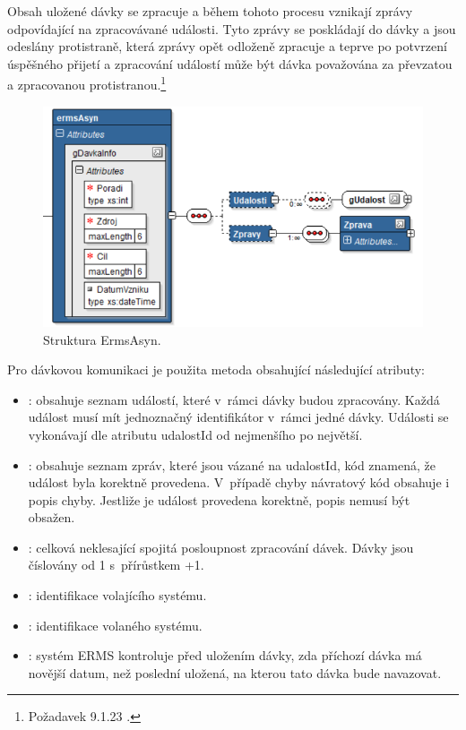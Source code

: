 \documentclass[
  master,
  field=ainfp,
  biblatex,
  language=czech,
  glossaries,
  theorems=false,
  index
]{kidiplom}
\begin{document}
Obsah uložené dávky se zpracuje a během tohoto procesu vznikají zprávy odpovídající na zpracovávané události. Tyto zprávy se poskládají do dávky a jsou odeslány protistraně, která zprávy opět odloženě zpracuje a teprve po potvrzení úspěšného přijetí a zpracování událostí může být dávka považována za převzatou a zpracovanou protistranou.\footnote{Požadavek 9.1.23 \cite[s.~64]{o00}.}

\begin{figure}[h]
  \centerline{\includegraphics[width=0.9\linewidth]{./images/ErmsAsyn.png}} 
  \caption{Struktura ErmsAsyn.} 
\end{figure}

Pro dávkovou komunikaci je použita metoda  obsahující následující atributy:
\begin{itemize}
	\item {}: obsahuje seznam událostí, které v~rámci dávky budou zpracovány. Každá událost musí mít jednoznačný identifikátor v~rámci jedné dávky. Události se vykonávají dle atributu udalostId od nejmenšího po největší. 
	\item {}: obsahuje seznam zpráv, které jsou vázané na udalostId, kód  znamená, že událost byla korektně provedena. V~případě chyby návratový kód obsahuje i popis chyby. Jestliže je událost provedena korektně, popis nemusí být obsažen.
	\item {}: celková neklesající spojitá posloupnost zpracování dávek. Dávky jsou číslovány od 1 s~přírůstkem +1.
	\item {}: identifikace volajícího systému.
	\item {}: identifikace volaného systému.
	\item {}: systém ERMS kontroluje před uložením dávky, zda příchozí dávka má novější datum, než poslední uložená, na kterou tato dávka bude navazovat.
\end{itemize}
\end{document}
